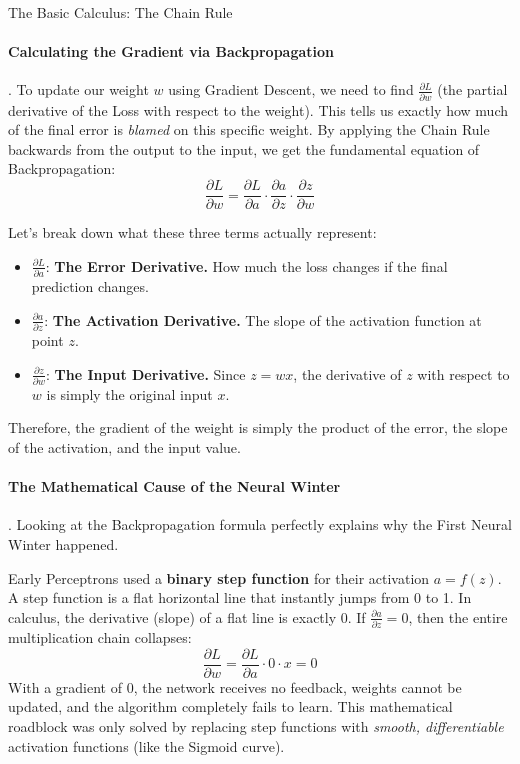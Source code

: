 \documentclass[11pt]{article}
\theoremstyle{smallexample}
\begin{document}
\begin{defbox}{The Basic Calculus: The Chain Rule}
\paragraph*{Calculating the Gradient via Backpropagation}.
To update our weight $w$ using Gradient Descent, we need to find $\frac{\partial L}{\partial w}$ (the partial derivative of the Loss with respect to the weight). This tells us exactly how much of the final error is \textit{blamed} on this specific weight. By applying the Chain Rule backwards from the output to the input, we get the fundamental equation of Backpropagation:
\begin{equation*}
\frac{\partial L}{\partial w} = \frac{\partial L}{\partial a} \cdot \frac{\partial a}{\partial z} \cdot \frac{\partial z}{\partial w}
\end{equation*}

Let's break down what these three terms actually represent:
\begin{itemize}
    \item $\frac{\partial L}{\partial a}$: \textbf{The Error Derivative.} How much the loss changes if the final prediction changes.
    \item $\frac{\partial a}{\partial z}$: \textbf{The Activation Derivative.} The slope of the activation function at point $z$.
    \item $\frac{\partial z}{\partial w}$: \textbf{The Input Derivative.} Since $z = wx$, the derivative of $z$ with respect to $w$ is simply the original input $x$.
\end{itemize}
Therefore, the gradient of the weight is simply the product of the error, the slope of the activation, and the input value.

\paragraph*{The Mathematical Cause of the Neural Winter}.
Looking at the Backpropagation formula perfectly explains why the First Neural Winter happened. 

Early Perceptrons used a \textbf{binary step function} for their activation $a = f(z)$. A step function is a flat horizontal line that instantly jumps from 0 to 1. In calculus, the derivative (slope) of a flat line is exactly $0$.  If $\frac{\partial a}{\partial z} = 0$, then the entire multiplication chain collapses:
\begin{equation*}
\frac{\partial L}{\partial w} = \frac{\partial L}{\partial a} \cdot 0 \cdot x = 0
\end{equation*}
With a gradient of 0, the network receives no feedback, weights cannot be updated, and the algorithm completely fails to learn. This mathematical roadblock was only solved by replacing step functions with \textit{smooth, differentiable} activation functions (like the Sigmoid curve).


\end{defbox}
\end{document}
